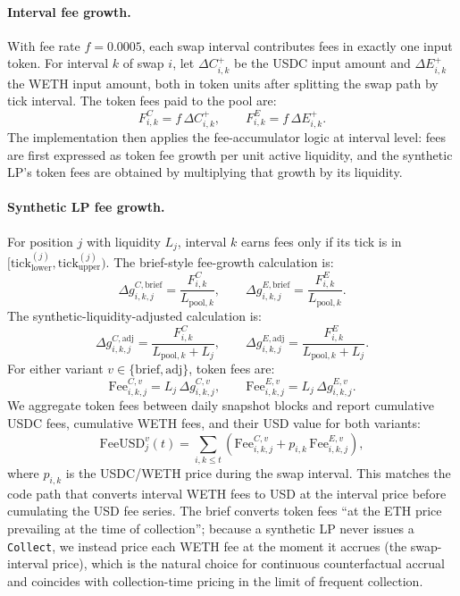 \paragraph{Interval fee growth.}
With fee rate $f=0.0005$, each swap interval contributes fees in exactly one
input token.  For interval $k$ of swap $i$, let
$\Delta C^{+}_{i,k}$ be the USDC input amount and $\Delta E^{+}_{i,k}$ the WETH
input amount, both in token units after splitting the swap path by tick
interval.  The token fees paid to the pool are:
\[
F^{C}_{i,k}=f\,\Delta C^{+}_{i,k},
\qquad
F^{E}_{i,k}=f\,\Delta E^{+}_{i,k}.
\]
The implementation then applies the fee-accumulator logic at interval level:
fees are first expressed as token fee growth per unit active liquidity, and the
synthetic LP's token fees are obtained by multiplying that growth by its
liquidity.

\paragraph{Synthetic LP fee growth.}
For position $j$ with liquidity $L_j$, interval $k$ earns fees only if its tick
is in $[\mathrm{tick}^{(j)}_{\mathrm{lower}},\mathrm{tick}^{(j)}_{\mathrm{upper}})$.
The brief-style fee-growth calculation is:
\[
\Delta g^{C,\mathrm{brief}}_{i,k,j}=\frac{F^{C}_{i,k}}{L_{\mathrm{pool},k}},
\qquad
\Delta g^{E,\mathrm{brief}}_{i,k,j}=\frac{F^{E}_{i,k}}{L_{\mathrm{pool},k}}.
\]
The synthetic-liquidity-adjusted calculation is:
\[
\Delta g^{C,\mathrm{adj}}_{i,k,j}=\frac{F^{C}_{i,k}}{L_{\mathrm{pool},k}+L_j},
\qquad
\Delta g^{E,\mathrm{adj}}_{i,k,j}=\frac{F^{E}_{i,k}}{L_{\mathrm{pool},k}+L_j}.
\]
For either variant $v\in\{\mathrm{brief},\mathrm{adj}\}$, token fees are:
\[
\mathrm{Fee}^{C,v}_{i,k,j}=L_j\,\Delta g^{C,v}_{i,k,j},
\qquad
\mathrm{Fee}^{E,v}_{i,k,j}=L_j\,\Delta g^{E,v}_{i,k,j}.
\]
We aggregate token fees between daily snapshot blocks and report cumulative USDC
fees, cumulative WETH fees, and their USD value for both variants:
\[
\mathrm{FeeUSD}^{v}_j(t)=
\sum_{i,k\le t}
\left(
\mathrm{Fee}^{C,v}_{i,k,j}
+p_{i,k}\,\mathrm{Fee}^{E,v}_{i,k,j}
\right),
\]
where $p_{i,k}$ is the USDC/WETH price during the swap interval. This matches
the code path that converts interval WETH fees to USD at the interval price
before cumulating the USD fee series.  The brief converts token fees ``at the
ETH price prevailing at the time of collection''; because a synthetic LP never
issues a \texttt{Collect}, we instead price each WETH fee at the moment it
accrues (the swap-interval price), which is the natural choice for continuous
counterfactual accrual and coincides with collection-time pricing in the limit
of frequent collection.

